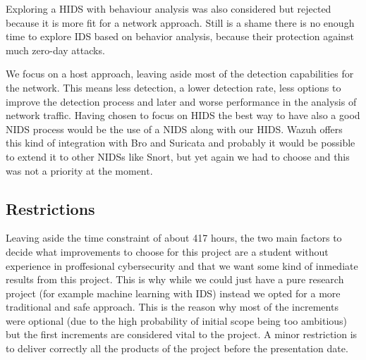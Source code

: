 \linej
\linej
Exploring a HIDS with behaviour analysis was also considered but rejected because it is more fit for a network approach. Still is a shame there is no enough time to explore IDS based on behavior analysis, because their protection against much zero-day attacks.

\linej
\linej
We focus on a host approach, leaving aside most of the detection capabilities for the network. This means less detection, a lower detection rate, less options to improve the detection process and later and worse performance in the analysis of network traffic. Having chosen to focus on HIDS the best way to have also a good NIDS process would be the use of a NIDS along with our HIDS.
\linej
Wazuh offers this kind of integration with Bro and Suricata and probably it would be possible to extend it to other NIDSs like Snort, but yet again we had to choose and this was not a priority at the moment.



\subsection{Restrictions}
Leaving aside the time constraint of about 417 hours, the two main factors to decide what improvements to choose for this project are a student without experience in proffesional cybersecurity and that we want some kind of inmediate results from this project. This is why while we could just have a pure research project (for example machine learning with IDS) instead we opted for a more traditional and safe approach. This is the reason why most of the increments were optional (due to the high probability of initial scope being too ambitious) but the first increments are considered vital to the project.
\linej
\linej
A minor restriction is to deliver correctly all the products of the project before the presentation date.


